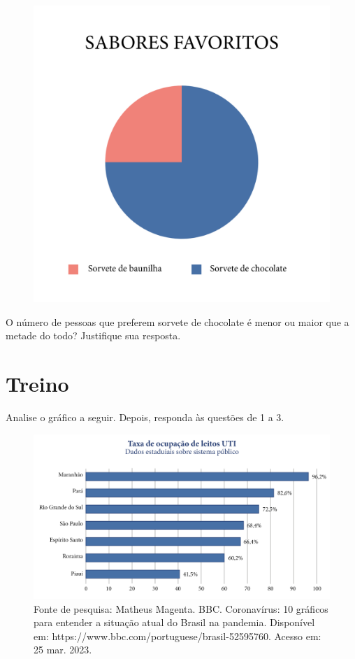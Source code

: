 \begin{figure}[htpb!]
\centering
\includegraphics[width=.7\textwidth]{../ilustracoes/POR5/SAEB_5ANO_POR_FIGURA1.png}
\end{figure}

O número de pessoas que preferem sorvete de chocolate é menor ou maior que a metade do todo? Justifique sua resposta.


\pagebreak
\section*{Treino}

\noindent{} Analise o gráfico a seguir. Depois, responda às questões de 1 a 3.

\begin{figure}[htpb!]
\includegraphics[width=\textwidth]{../ilustracoes/POR5/SAEB_5ANO_POR_FIGURA5.png}
\caption{Fonte de pesquisa: Matheus Magenta. BBC. Coronavírus: 10 gráficos para entender a situação atual do Brasil na pandemia. Disponível em: https://www.bbc.com/portuguese/brasil-52595760. Acesso em: 25 mar. 2023.}
\end{figure}

